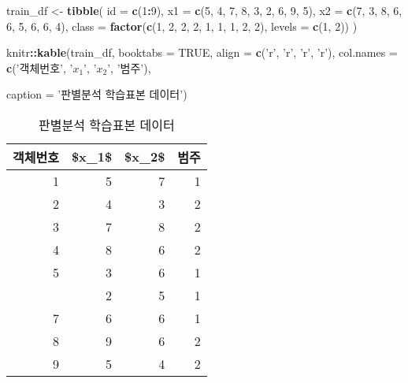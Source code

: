 \documentclass[]{book}
\newenvironment{Shaded}{\begin{snugshade}}{\end{snugshade}}
\newcommand{\DataTypeTok}[1]{\textcolor[rgb]{0.13,0.29,0.53}{#1}}
\newcommand{\DecValTok}[1]{\textcolor[rgb]{0.00,0.00,0.81}{#1}}
\newcommand{\KeywordTok}[1]{\textcolor[rgb]{0.13,0.29,0.53}{\textbf{#1}}}
\newcommand{\NormalTok}[1]{#1}
\newcommand{\OperatorTok}[1]{\textcolor[rgb]{0.81,0.36,0.00}{\textbf{#1}}}
\newcommand{\OtherTok}[1]{\textcolor[rgb]{0.56,0.35,0.01}{#1}}
\newcommand{\StringTok}[1]{\textcolor[rgb]{0.31,0.60,0.02}{#1}}
\begin{document}
\begin{Shaded}
\begin{Highlighting}[]
\NormalTok{train_df <-}\StringTok{ }\KeywordTok{tibble}\NormalTok{(}
  \DataTypeTok{id =} \KeywordTok{c}\NormalTok{(}\DecValTok{1}\OperatorTok{:}\DecValTok{9}\NormalTok{),}
  \DataTypeTok{x1 =} \KeywordTok{c}\NormalTok{(}\DecValTok{5}\NormalTok{, }\DecValTok{4}\NormalTok{, }\DecValTok{7}\NormalTok{, }\DecValTok{8}\NormalTok{, }\DecValTok{3}\NormalTok{, }\DecValTok{2}\NormalTok{, }\DecValTok{6}\NormalTok{, }\DecValTok{9}\NormalTok{, }\DecValTok{5}\NormalTok{),}
  \DataTypeTok{x2 =} \KeywordTok{c}\NormalTok{(}\DecValTok{7}\NormalTok{, }\DecValTok{3}\NormalTok{, }\DecValTok{8}\NormalTok{, }\DecValTok{6}\NormalTok{, }\DecValTok{6}\NormalTok{, }\DecValTok{5}\NormalTok{, }\DecValTok{6}\NormalTok{, }\DecValTok{6}\NormalTok{, }\DecValTok{4}\NormalTok{),}
  \DataTypeTok{class =} \KeywordTok{factor}\NormalTok{(}\KeywordTok{c}\NormalTok{(}\DecValTok{1}\NormalTok{, }\DecValTok{2}\NormalTok{, }\DecValTok{2}\NormalTok{, }\DecValTok{2}\NormalTok{, }\DecValTok{1}\NormalTok{, }\DecValTok{1}\NormalTok{, }\DecValTok{1}\NormalTok{, }\DecValTok{2}\NormalTok{, }\DecValTok{2}\NormalTok{), }\DataTypeTok{levels =} \KeywordTok{c}\NormalTok{(}\DecValTok{1}\NormalTok{, }\DecValTok{2}\NormalTok{))}
\NormalTok{)}

\NormalTok{knitr}\OperatorTok{::}\KeywordTok{kable}\NormalTok{(train_df, }\DataTypeTok{booktabs =} \OtherTok{TRUE}\NormalTok{,}
             \DataTypeTok{align =} \KeywordTok{c}\NormalTok{(}\StringTok{'r'}\NormalTok{, }\StringTok{'r'}\NormalTok{, }\StringTok{'r'}\NormalTok{, }\StringTok{'r'}\NormalTok{),}
             \DataTypeTok{col.names =} \KeywordTok{c}\NormalTok{(}\StringTok{'객체번호'}\NormalTok{, }\StringTok{'$x_1$'}\NormalTok{, }\StringTok{'$x_2$'}\NormalTok{, }\StringTok{'범주'}\NormalTok{),}
             
             \DataTypeTok{caption =} \StringTok{'판별분석 학습표본 데이터'}\NormalTok{)}
\end{Highlighting}
\end{Shaded}

\begin{table}[t]

\caption{\label{tab:da-train-data-table}판별분석 학습표본 데이터}
\centering
\begin{tabular}{rrrr}
\toprule
객체번호 & \$x\_1\$ & \$x\_2\$ & 범주\\
\midrule
1 & 5 & 7 & 1\\
2 & 4 & 3 & 2\\
3 & 7 & 8 & 2\\
4 & 8 & 6 & 2\\
5 & 3 & 6 & 1\\
\addlinespace
6 & 2 & 5 & 1\\
7 & 6 & 6 & 1\\
8 & 9 & 6 & 2\\
9 & 5 & 4 & 2\\
\bottomrule
\end{tabular}
\end{table}
\end{document}
